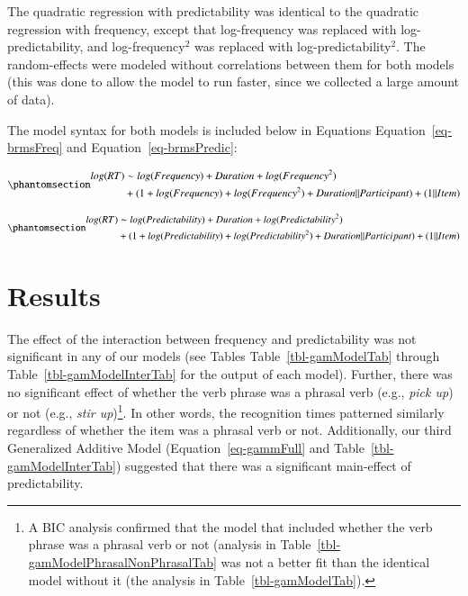 \documentclass[
  authoryear,
  preprint,
  1p,
  onecolumn]{elsarticle}
\begin{document}
The quadratic regression with predictability was identical to the
quadratic regression with frequency, except that log-frequency was
replaced with log-predictability, and log-frequency\(^2\) was replaced
with log-predictability\(^2\). The random-effects were modeled without
correlations between them for both models (this was done to allow the
model to run faster, since we collected a large amount of data).

The model syntax for both models is included below in Equations
Equation~\ref{eq-brmsFreq} and Equation~\ref{eq-brmsPredic}:

\begin{equation}\phantomsection\label{eq-brmsFreq}{
\begin{aligned}
log(RT) & \sim log(Frequency) + Duration + log(Frequency^2) \\ & + (1 + log(Frequency) + log(Frequency^2) + Duration || Participant) + (1 || Item)
\end{aligned}
}\end{equation}

\begin{equation}\phantomsection\label{eq-brmsPredic}{
\begin{aligned}
log(RT) & \sim log(Predictability) + Duration + log(Predictability^2) \\ & + (1 + log(Predictability) + log(Predictability^2) + Duration || Participant) + (1 || Item)
\end{aligned}
}\end{equation}

\section{Results}\label{results}

The effect of the interaction between frequency and predictability was
not significant in any of our models (see Tables
Table~\ref{tbl-gamModelTab} through Table~\ref{tbl-gamModelInterTab} for
the output of each model). Further, there was no significant effect of
whether the verb phrase was a phrasal verb (e.g., \emph{pick up}) or not
(e.g., \emph{stir up})\footnote{A BIC analysis confirmed that the model
  that included whether the verb phrase was a phrasal verb or not
  (analysis in Table~\ref{tbl-gamModelPhrasalNonPhrasalTab} was not a
  better fit than the identical model without it (the analysis in
  Table~\ref{tbl-gamModelTab}).}. In other words, the recognition times
patterned similarly regardless of whether the item was a phrasal verb or
not. Additionally, our third Generalized Additive Model
(Equation~\ref{eq-gammFull} and Table~\ref{tbl-gamModelInterTab})
suggested that there was a significant main-effect of predictability.
\end{document}
